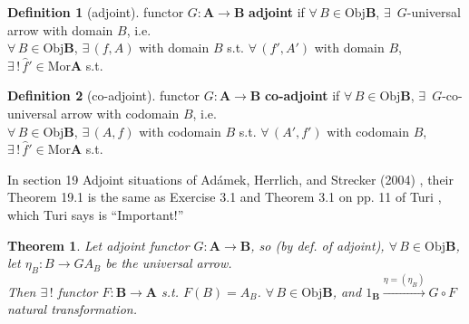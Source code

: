 \documentclass[twoside,landscape,10pt]{amsart}
\theoremstyle{plain}
\newtheorem{theorem}{Theorem}
\theoremstyle{definition}
\newtheorem{definition}{Definition}
\theoremstyle{remark}
\begin{document}
\begin{multicols*}{2}
\begin{definition}[adjoint]
  functor $G : \mathbf{A} \to \mathbf{B}$ \textbf{adjoint} if $\forall \, B \in \text{Obj}\mathbf{B}$, $\exists \, $ $G$-universal arrow with domain $B$, i.e. \\
$\forall \, B\in \text{Obj}\mathbf{B}$, $\exists \, (f,A)$ with domain $B$ s.t. $\forall \, (f',A')$ with domain $B$, $\exists \, ! \, \widehat{f}' \in \text{Mor}\mathbf{A}$ s.t.



\end{definition}

\begin{definition}[co-adjoint]
functor $G: \mathbf{A} \to \mathbf{B}$  \textbf{co-adjoint} if $\forall \, B \in \text{Obj}\mathbf{B}$, $\exists \, $ $G$-co-universal arrow with codomain $B$, i.e. \\
$\forall \, B\in \text{Obj}\mathbf{B}$, $\exists \, (A,f)$ with codomain $B$ s.t. $\forall \, (A',f')$ with codomain $B$, $\exists \, ! \, \widehat{f}' \in \text{Mor}\mathbf{A}$ s.t.


\end{definition}

In section 19 Adjoint situations of Ad\'{a}mek, Herrlich, and Strecker (2004) \cite{AHS2004}, their Theorem 19.1 is the same as Exercise 3.1 and Theorem 3.1 on pp. 11 of Turi \cite{Turi2001}, which Turi says is ``Important!''

\begin{theorem}
  Let adjoint functor $G: \mathbf{A} \to \mathbf{B}$, so (by def. of adjoint), $\forall \, B \in \text{Obj}\mathbf{B}$, let $\eta_B:B \to GA_B$ be the universal arrow.  \\
Then $\exists \, !$ functor $F:\mathbf{B} \to \mathbf{A}$ s.t. $F(B) = A_B$.  $\forall \, B \in \text{Obj}\mathbf{B}$, and $1_{\mathbf{B}} \xrightarrow{ \eta = (\eta_B)} G\circ F$ natural transformation.  


\end{theorem}
\end{multicols*}
\end{document}
